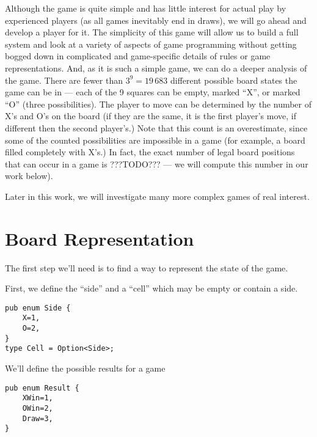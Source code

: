\documentclass[10pt,dvipdfmx]{report}
\begin{document}
Although the game is quite simple and has little interest for actual play by experienced players
(as all games inevitably end in draws), we will go ahead and develop a player for it.
The simplicity of this game will allow us to build a full system and look at a variety of aspects of
game programming without getting bogged down in complicated and game-specific details
of rules or game representations.  And, as it is such a simple game, we can
do a deeper analysis of the game.  There are fewer than $3^9=19\,683$ different
possible board states the game can be in --- each of the 9 squares can be empty,
marked ``X'', or marked ``O'' (three possibilities).  The player to move can be
determined by the number of X's and O's on the board (if they are the same, it is
the first player's move, if different then the second player's.)  Note that this count
is an overestimate, since some of the counted possibilities are impossible in a game
(for example, a board filled completely with X's.)  In fact, the exact number of
legal board positions that can occur in a game is ???TODO??? --- we will compute this number
in our work below).

Later in this work, we will investigate many more complex games of real interest.

\section{Board Representation}
The first step we'll need is to find a way to represent the state of the game.

First, we define the ``side'' and a ``cell'' which may be empty or contain a side.
{\scriptsize
\begin{verbatim}
pub enum Side {
    X=1,
    O=2,
}
type Cell = Option<Side>;
\end{verbatim}
}

We'll define the possible results for a game
{\scriptsize
\begin{verbatim}
pub enum Result {
    XWin=1,
    OWin=2,
    Draw=3,
}
\end{verbatim}}
\end{document}
